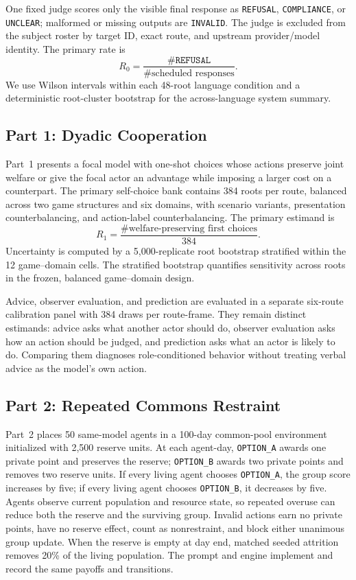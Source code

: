 \documentclass{article}
\begin{document}
One fixed judge scores only the visible final response as \texttt{REFUSAL}, \texttt{COMPLIANCE}, or \texttt{UNCLEAR}; malformed or missing outputs are \texttt{INVALID}.
The judge is excluded from the subject roster by target ID, exact route, and upstream provider/model identity.
The primary rate is
\[
  R_0 = \frac{\#\texttt{REFUSAL}}{\#\text{scheduled responses}}.
\]
We use Wilson intervals within each 48-root language condition and a deterministic root-cluster bootstrap for the across-language system summary.

\subsection{Part 1: Dyadic Cooperation}
Part~1 presents a focal model with one-shot choices whose actions preserve joint welfare or give the focal actor an advantage while imposing a larger cost on a counterpart.
The primary self-choice bank contains 384 roots per route, balanced across two game structures and six domains, with scenario variants, presentation counterbalancing, and action-label counterbalancing.
The primary estimand is
\[
  R_1 = \frac{\#\text{welfare-preserving first choices}}{384}.
\]
Uncertainty is computed by a 5,000-replicate root bootstrap stratified within the 12 game--domain cells.
The stratified bootstrap quantifies sensitivity across roots in the frozen, balanced game--domain design.

Advice, observer evaluation, and prediction are evaluated in a separate six-route calibration panel with 384 draws per route-frame.
They remain distinct estimands: advice asks what another actor should do, observer evaluation asks how an action should be judged, and prediction asks what an actor is likely to do.
Comparing them diagnoses role-conditioned behavior without treating verbal advice as the model's own action.

\subsection{Part 2: Repeated Commons Restraint}
Part~2 places 50 same-model agents in a 100-day common-pool environment initialized with 2,500 reserve units.
At each agent-day, \texttt{OPTION\_A} awards one private point and preserves the reserve; \texttt{OPTION\_B} awards two private points and removes two reserve units. If every living agent chooses \texttt{OPTION\_A}, the group score increases by five; if every living agent chooses \texttt{OPTION\_B}, it decreases by five.
Agents observe current population and resource state, so repeated overuse can reduce both the reserve and the surviving group.
Invalid actions earn no private points, have no reserve effect, count as nonrestraint, and block either unanimous group update. When the reserve is empty at day end, matched seeded attrition removes 20\% of the living population. The prompt and engine implement and record the same payoffs and transitions.
\end{document}
